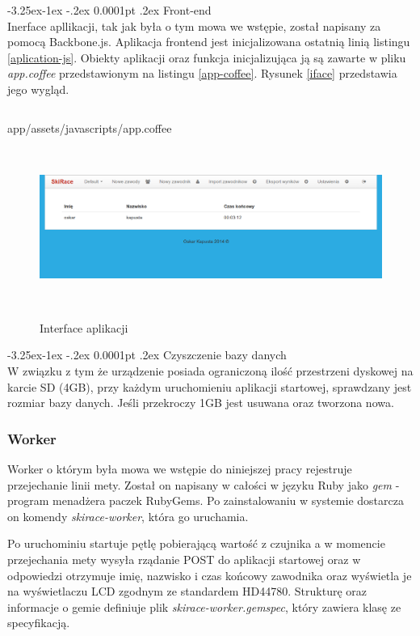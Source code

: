 \documentclass[11pt,a4paper, twoside]{article}
\makeatletter
\renewcommand\paragraph{\@startsection{paragraph}{4}{\z@}%
                                     {-3.25ex\@plus -1ex \@minus -.2ex}%
                                     {0.0001pt \@plus .2ex}%
                                     {\normalfont\normalsize\bfseries}}
\makeatother
\begin{document}
\paragraph{Front-end} ~\\
Inerface apllikacji, tak jak była o tym mowa we wstępie, został napisany za pomocą Backbone.js. Aplikacja frontend jest inicjalizowana ostatnią linią listingu \ref{aplication-js}. Obiekty aplikacji oraz funkcja inicjalizująca ją są zawarte w pliku \emph{app.coffee} przedstawionym na listingu \ref{app-coffee}. Rysunek \ref{iface} przedstawia jego wygląd.
\begin{listing}[H]
\inputminted{js}{./src/app.coffee}
\caption{app/assets/javascripts/app.coffee}
$\label{app-coffee}$
\end{listing}
\begin{figure}[ht]
\includegraphics[scale=0.35]{./img/interface.png}
\caption{Interface aplikacji}
$\label{iface}$
\end{figure}
\newpage
\paragraph{Czyszczenie bazy danych} ~\\
W związku z tym że urządzenie posiada ograniczoną ilość przestrzeni dyskowej na karcie SD (4GB), przy każdym uruchomieniu aplikacji startowej, sprawdzany jest rozmiar bazy danych. Jeśli przekroczy 1GB jest usuwana oraz tworzona nowa.
\newpage
\subsubsection{Worker}
Worker o którym była mowa we wstępie do niniejszej pracy rejestruje przejechanie linii mety. Został on napisany w całości w języku Ruby jako \emph{gem} - program menadżera paczek RubyGems. Po zainstalowaniu w systemie dostarcza on komendy \emph{skirace-worker}, która go uruchamia.


Po uruchominiu startuje pętlę pobierającą wartość z czujnika a w momencie przejechania mety wysyła rządanie POST do aplikacji startowej oraz w odpowiedzi otrzymuje imię, nazwisko i czas końcowy zawodnika oraz wyświetla je na wyświetlaczu LCD zgodnym ze standardem HD44780. Strukturę oraz informacje o gemie definiuje plik \emph{skirace-worker.gemspec}, który zawiera klasę ze specyfikacją.
\end{document}
